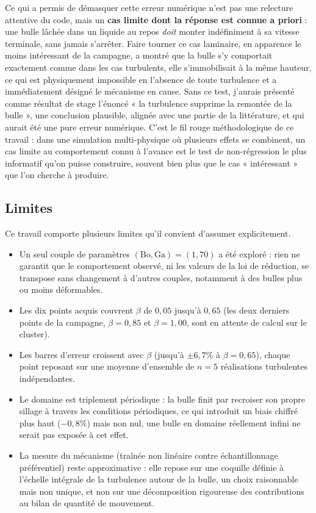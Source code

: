 Ce qui a permis de démasquer cette erreur numérique n'est pas une relecture attentive du
code, mais un \textbf{cas limite dont la réponse est connue a priori} : une
bulle lâchée dans un liquide au repos \emph{doit} monter
indéfiniment à sa vitesse terminale, sans jamais s'arrêter. Faire tourner ce cas
laminaire, en apparence le moins intéressant de la campagne, a montré que la
bulle s'y comportait exactement comme dans les cas turbulents, elle
s'immobilisait à la même hauteur, ce qui est physiquement impossible en
l'absence de toute turbulence et a immédiatement désigné le mécanisme en cause.
Sans ce test, j'aurais présenté comme résultat de stage l'énoncé « la turbulence
supprime la remontée de la bulle », une conclusion plausible, alignée avec une
partie de la littérature, et qui aurait été une pure erreur numérique. C'est le
fil rouge méthodologique de ce travail : dans une simulation multi-physique où
plusieurs effets se combinent, un cas limite au comportement connu à l'avance
est le test de non-régression le plus informatif qu'on puisse construire,
souvent bien plus que le cas « intéressant » que l'on cherche à produire.

\subsection{Limites}

Ce travail comporte plusieurs limites qu'il convient d'assumer explicitement.

\begin{itemize}
    \item Un seul couple de paramètres $(\mathrm{Bo},\mathrm{Ga})=(1,70)$ a été
    exploré : rien ne garantit que le comportement observé, ni les valeurs de
    la loi de réduction, se transpose sans changement à d'autres couples,
    notamment à des bulles plus ou moins déformables.
    \item Les dix points acquis couvrent $\beta$ de $0{,}05$ jusqu'à $0{,}65$ (les deux derniers points de la campagne, $\beta=0{,}85$ et $\beta=1{,}00$, sont en attente de calcul sur le cluster).
    \item Les barres d'erreur croissent avec $\beta$ (jusqu'à $\pm6{,}7\%$ à $\beta=0{,}65$), chaque point reposant sur une moyenne d'ensemble de $n=5$ réalisations turbulentes indépendantes.
    \item Le domaine est triplement périodique : la bulle finit par recroiser
    son propre sillage à travers les conditions périodiques, ce qui introduit un
    biais chiffré plus haut ($-0{,}8\%$) mais non nul, une bulle en domaine
    réellement infini ne serait pas exposée à cet effet.
    \item La mesure du mécanisme (traînée non linéaire contre échantillonnage
    préférentiel) reste approximative : elle repose sur une coquille définie à
    l'échelle intégrale de la turbulence autour de la bulle, un choix
    raisonnable mais non unique, et non sur une décomposition rigoureuse des
    contributions au bilan de quantité de mouvement.
\end{itemize}

